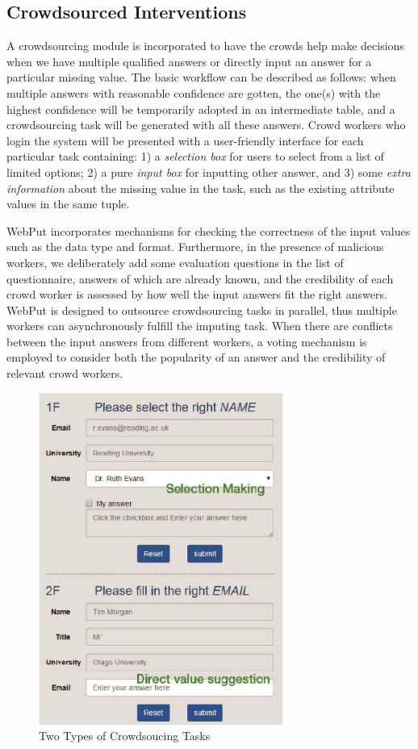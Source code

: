 \documentclass[sigconf]{acmart}
\begin{document}
\subsection{Crowdsourced Interventions}
%
A crowdsourcing module is incorporated to have the crowds help make decisions when we have multiple qualified answers or directly input an answer for a particular missing value.
%
The basic workflow can be described as follows: when multiple answers with reasonable confidence are gotten, the one(s) with the highest confidence will be temporarily adopted in an intermediate table, and a crowdsourcing task will be generated with all these answers. Crowd workers who login the system will be presented with a user-friendly interface for each particular task containing: 1) a {\em selection box} for users to select from a list of limited options; 2) a pure {\em input box} for inputting other answer, and 3) some {\em extra information} about the missing value in the task, such as the existing attribute values in the same tuple.

WebPut incorporates mechanisms for checking the correctness of the input values such as the data type and format. Furthermore, in the presence of malicious workers, we deliberately add some evaluation questions in the list of questionnaire, answers of which are already known, and the credibility of each crowd worker is assessed by how well the input answers fit the right answers.
%
WebPut is designed to outsource crowdsourcing tasks in parallel, thus multiple workers can asynchronously fulfill the imputing task. When there are conflicts between the input answers from different workers, a voting mechanism is employed to consider both the popularity of an answer and the credibility of relevant crowd workers.

\begin{figure}[!htb]
  \centerline{\includegraphics[width=8cm]{images/crowd.eps}}
  \caption{Two Types of Crowdsoucing Tasks}
  \label{fig:crowdsource}
\end{figure}
\end{document}
